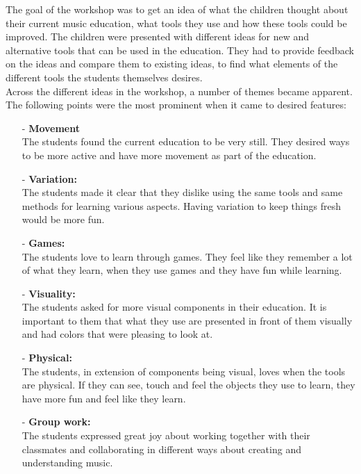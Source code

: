 The goal of the workshop was to get an idea of what the children thought about their current music education, what tools they use and how these tools could be improved. The children were presented with different ideas for new and alternative tools that can be used in the education. They had to provide feedback on the ideas and compare them to existing ideas, to find what elements of the different tools the students themselves desires.\\

Across the different ideas in the workshop, a number of themes became apparent. The following points were the most prominent when it came to desired features:


\begin{itemize}
	\item[-] \textbf{Movement}\\
	The students found the current education to be very still. They desired ways to be more active and have more movement as part of the education.\\
	\item[-] \textbf{Variation:}\\
	The students made it clear that they dislike using the same tools and same methods for learning various aspects. Having variation to keep things fresh would be more fun.\\
	\item[-] \textbf{Games:}\\
	The students love to learn through games. They feel like they remember a lot of what they learn, when they use games and they have fun while learning. \\
	\item[-] \textbf{Visuality:}\\
	The students asked for more visual components in their education. It is important to them that what they use are presented in front of them visually and had colors that were pleasing to look at.\\
	\item[-] \textbf{Physical:}\\
	The students, in extension of components being visual, loves when the tools are physical. If they can see, touch and feel the objects they use to learn, they have more fun and feel like they learn.\\
	\item[-] \textbf{Group work:}\\
	The students expressed great joy about working together with their classmates and collaborating in different ways about creating and understanding music.\\
	
\end{itemize}



